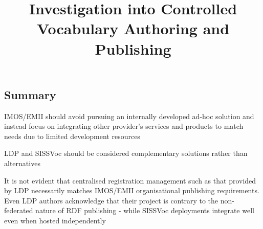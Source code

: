 \documentclass[10pt,a4paper]{article}
\title{Investigation into Controlled Vocabulary Authoring and Publishing}
\date{}
\newenvironment{italicquotes}
{\begin{quote}\itshape}
{\end{quote}}
\let\Item\item
\newcommand\SpecialItem{\renewcommand\item[1][]{\Item[\textbullet~\bfseries##1]}}
\begin{document}
\SpecialItem

  \maketitle
    \begin{flushleft}



% 
% 



\section{
	Summary
}

\item[] IMOS/EMII should avoid pursuing an internally developed ad-hoc solution and instead 
focus on integrating other provider's services and products to match needs due 
to limited development resources
\item[] LDP and SISSVoc should be considered complementary solutions rather than alternatives
\item[] It is not evident that centralised registration management such as 
that provided by LDP necessarily matches IMOS/EMII organisational publishing 
requirements. Even LDP authors acknowledge that their project is contrary to the 
non-federated nature of RDF publishing - while SISSVoc deployments integrate well 
even when hosted independently


\end{flushleft}
\end{document}
